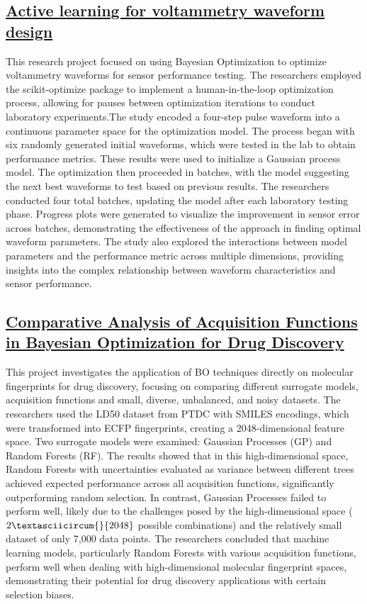  \subsection*{\href{https://www.youtube.com/watch?v=78bKXIIB_GA}{Active learning for voltammetry waveform design}}

This research project focused on using Bayesian Optimization to optimize voltammetry waveforms for sensor performance testing. The researchers employed the scikit-optimize package to implement a human-in-the-loop optimization process, allowing for pauses between optimization iterations to conduct laboratory experiments.The study encoded a four-step pulse waveform into a continuous parameter space for the optimization model. The process began with six randomly generated initial waveforms, which were tested in the lab to obtain performance metrics. These results were used to initialize a Gaussian process model. The optimization then proceeded in batches, with the model suggesting the next best waveforms to test based on previous results. The researchers conducted four total batches, updating the model after each laboratory testing phase. Progress plots were generated to visualize the improvement in sensor error across batches, demonstrating the effectiveness of the approach in finding optimal waveform parameters. The study also explored the interactions between model parameters and the performance metric across multiple dimensions, providing insights into the complex relationship between waveform characteristics and sensor performance.
 \subsection*{\href{https://www.youtube.com/watch?v=5AjwoZtjgOc}{Comparative Analysis of Acquisition Functions in Bayesian Optimization for Drug Discovery}}

This project investigates the application of BO techniques directly on molecular fingerprints for drug discovery, focusing on comparing different surrogate models, acquisition functions and small, diverse, unbalanced, and noisy datasets\cite{bellamy2022batched}. The researchers used the LD50 dataset from PTDC with SMILES encodings\cite{wu2018quantitative,chen2021algebraic}, which were transformed into ECFP fingerprints\cite{rogers2010extended}, creating a 2048-dimensional feature space. Two surrogate models were examined: Gaussian Processes (GP) and Random Forests (RF). The results showed that in this high-dimensional space, Random Forests with uncertainties evaluated as variance between different trees achieved expected performance across all acquisition functions, significantly outperforming random selection. In contrast, Gaussian Processes failed to perform well, likely due to the challenges posed by the high-dimensional space ($2\textasciicircum{}{2048}$ possible combinations) and the relatively small dataset of only 7,000 data points. The researchers concluded that machine learning models, particularly Random Forests with various acquisition functions, perform well when dealing with high-dimensional molecular fingerprint spaces, demonstrating their potential for drug discovery applications with certain selection biases.
